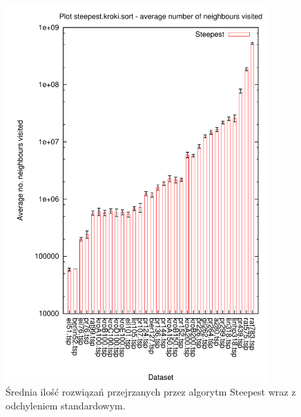 \begin{figure}
\begin{center}
\includegraphics[width=0.9\textwidth]{wykresy/steepest_sasiedzi}
\end{center}
\caption{Średnia ilość rozwiązań przejrzanych przez algorytm Steepest wraz z odchyleniem standardowym.}
\label{steepest_sasiedzi}
\end{figure}


